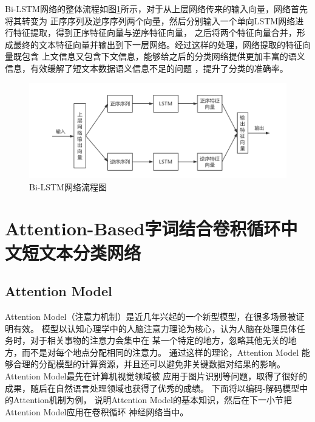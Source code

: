 Bi-LSTM网络的整体流程如图\ref{Bi-LSTM}所示，对于从上层网络传来的输入向量，网络首先将其转变为
正序序列及逆序序列两个向量，然后分别输入一个单向LSTM网络进行特征提取，得到正序特征向量与逆序特征向量，
之后将两个特征向量合并，形成最终的文本特征向量并输出到下一层网络。经过这样的处理，网络提取的特征向量既包含
上文信息又包含下文信息，能够给之后的分类网络提供更加丰富的语义信息，有效缓解了短文本数据语义信息不足的问题
，提升了分类的准确率。
\begin{figure}[h]
    \includegraphics[scale=0.4]{picture/Bi-LSTM.png}
    \caption{Bi-LSTM网络流程图}
    \label{Bi-LSTM}
\end{figure}

\section{Attention-Based字词结合卷积循环中文短文本分类网络}
\subsection{Attention Model}
Attention Model（注意力机制）是近几年兴起的一个新型模型，在很多场景被证明有效。
模型以认知心理学中的人脑注意力理论为核心，认为人脑在处理具体任务时，对于相关事物的注意力会集中在
某一个特定的地方，忽略其他无关的地方，而不是对每个地点分配相同的注意力。
通过这样的理论，Attention Model
能够合理的分配模型的计算资源，并且还可以避免非关键数据对结果的影响。
Attention Model最先在计算机视觉领域被
应用于图片识别等问题，取得了很好的成果，随后在自然语言处理领域也获得了优秀的成绩。
下面将以编码-解码模型中的Attention机制为例，
说明Attention Model的基本知识，然后在下一小节把Attention Model应用在卷积循环
神经网络当中。

